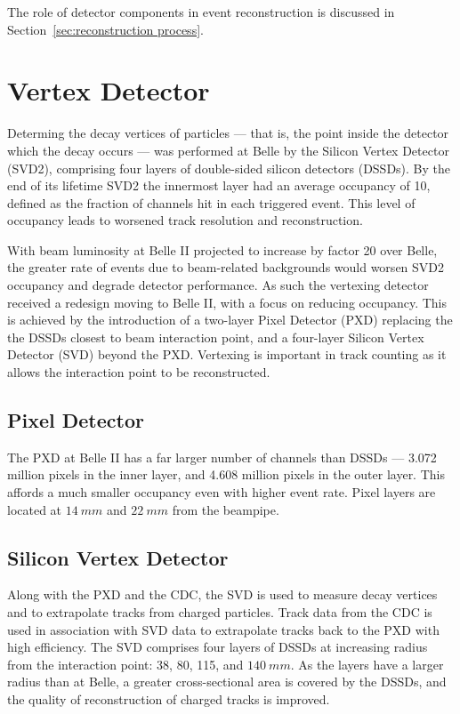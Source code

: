 \documentclass[12pt]{thesis}  %
\begin{document}
The role of detector components in event reconstruction is discussed in Section~\ref{sec:reconstruction process}.


\section{Vertex Detector}

Determing the decay vertices of particles --- that is, the point inside the detector which the decay occurs --- was performed at Belle by the Silicon Vertex Detector (SVD2), comprising four layers of double-sided silicon detectors (DSSDs). By the end of its lifetime SVD2 the innermost layer had an average occupancy of \num{10}{\percent}, defined as the fraction of channels hit in each triggered event. This level of occupancy leads to worsened track resolution and reconstruction.

With beam luminosity at Belle II projected to increase by factor 20 over Belle, the greater rate of events due to beam-related backgrounds would worsen SVD2 occupancy and degrade detector performance.  As such the vertexing detector received a redesign moving to Belle II, with a focus on reducing occupancy. This is achieved by the introduction of a two-layer Pixel Detector (PXD) replacing the the DSSDs closest to beam interaction point, and a four-layer Silicon Vertex Detector (SVD) beyond the PXD. Vertexing is important in track counting as it allows the interaction point to be reconstructed.

\subsection{Pixel Detector}

The PXD at Belle II has a far larger number of channels than DSSDs --- 3.072 million pixels in the inner layer, and 4.608 million pixels in the outer layer. This affords a much smaller occupancy even with higher event rate. Pixel layers are located at $\SI{14}{mm}$ and $\SI{22}{mm}$ from the beampipe.


\subsection{Silicon Vertex Detector}

Along with the PXD and the CDC, the SVD is used to measure decay vertices and to extrapolate tracks from charged particles. Track data from the CDC is used in association with SVD data to extrapolate tracks back to the PXD with high efficiency. The SVD comprises four layers of DSSDs at increasing radius from the interaction point: 38, 80, 115, and $\SI{140}{mm}$. As the layers have a larger radius than at Belle, a greater cross-sectional area is covered by the DSSDs, and the quality of reconstruction of charged tracks is improved.
\end{document}
